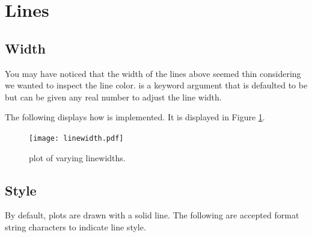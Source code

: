 \section*{Lines} %

\subsection*{Width} %

You may have noticed that the width of the lines above seemed thin considering we wanted to inspect the line color.  is a keyword argument that is defaulted to be  but can be given any real number to adjust the line width. 

The following displays how  is implemented.
It is displayed in Figure \ref{linewidth}.



\begin{figure} %
\texttt{[image: linewidth.pdf]}
\caption{plot of varying linewidths.}
\label{linewidth} 
\end{figure}

\subsection*{Style} %

By default, plots are drawn with a solid line.
The following are accepted format string characters to indicate line style.

